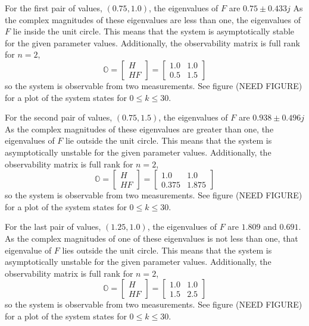 \documentclass[11pt]{article}
\begin{document}
For the first pair of values, $(0.75,1.0)$, the eigenvalues of $F$ are $0.75\pm0.433j$ As the complex magnitudes of these eigenvalues are less than one, the eigenvalues of $F$ lie inside the unit circle. This means that the system is asymptotically stable for the given parameter values. Additionally, the observability matrix is full rank for $n=2$, 
\begin{equation*}
	\mathbb{O} = \begin{bmatrix} H \\ HF \end{bmatrix} = \begin{bmatrix} 1.0 & 1.0 \\ 0.5 & 1.5 \end{bmatrix}
\end{equation*}
so the system is observable from two measurements. See figure (NEED FIGURE) for a plot of the system states for $0\leq k\leq 30$.

For the second pair of values, $(0.75,1.5)$, the eigenvalues of $F$ are $0.938\pm0.496j$ As the complex magnitudes of these eigenvalues are greater than one, the eigenvalues of $F$ lie outside the unit circle. This means that the system is asymptotically unstable for the given parameter values. Additionally, the observability matrix is full rank for $n=2$, 
\begin{equation*}
	\mathbb{O} = \begin{bmatrix} H \\ HF \end{bmatrix} = \begin{bmatrix} 1.0 & 1.0 \\ 0.375 & 1.875 \end{bmatrix}
\end{equation*}
so the system is observable from two measurements. See figure (NEED FIGURE) for a plot of the system states for $0\leq k\leq 30$.

For the last pair of values, $(1.25,1.0)$, the eigenvalues of $F$ are $1.809$ and $0.691$. As the complex magnitudes of one of these eigenvalues is not less than one, that eigenvalue of $F$ lies outside the unit circle. This means that the system is asymptotically unstable for the given parameter values. Additionally, the observability matrix is full rank for $n=2$, 
\begin{equation*}
	\mathbb{O} = \begin{bmatrix} H \\ HF \end{bmatrix} = \begin{bmatrix} 1.0 & 1.0 \\ 1.5 & 2.5 \end{bmatrix}
\end{equation*}
so the system is observable from two measurements. See figure (NEED FIGURE) for a plot of the system states for $0\leq k\leq 30$.
\end{document}
